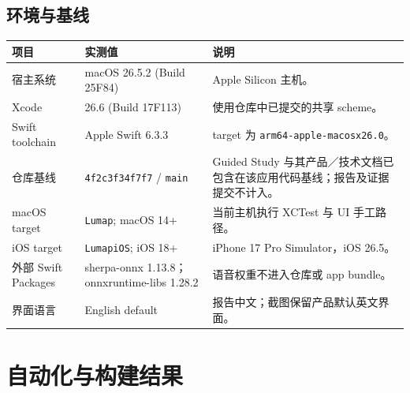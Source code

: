 \documentclass[10pt,a4paper,fontset=none]{ctexart}
\newcommand{\code}[1]{\begingroup\urlstyle{tt}\nolinkurl{#1}\endgroup}
\begin{document}
\subsection{环境与基线}
\begin{table}[htbp]
\centering
\small
\begin{tabularx}{\textwidth}{P{39mm}P{50mm}Y}
\toprule
项目 & 实测值 & 说明 \\
\midrule
宿主系统 & macOS 26.5.2 (Build 25F84) & Apple Silicon 主机。 \\
Xcode & 26.6 (Build 17F113) & 使用仓库中已提交的共享 scheme。 \\
Swift toolchain & Apple Swift 6.3.3 & target 为 \code{arm64-apple-macosx26.0}。 \\
仓库基线 & \code{4f2c3f34f7f7} / \code{main} & Guided Study 与其产品／技术文档已包含在该应用代码基线；报告及证据提交不计入。 \\
macOS target & \code{Lumap}; macOS 14+ & 当前主机执行 XCTest 与 UI 手工路径。 \\
iOS target & \code{LumapiOS}; iOS 18+ & iPhone 17 Pro Simulator，iOS 26.5。 \\
外部 Swift Packages & sherpa-onnx 1.13.8；onnxruntime-libs 1.28.2 & 语音权重不进入仓库或 app bundle。 \\
界面语言 & English default & 报告中文；截图保留产品默认英文界面。 \\
\bottomrule
\end{tabularx}
\end{table}

\section{自动化与构建结果}
\end{document}
